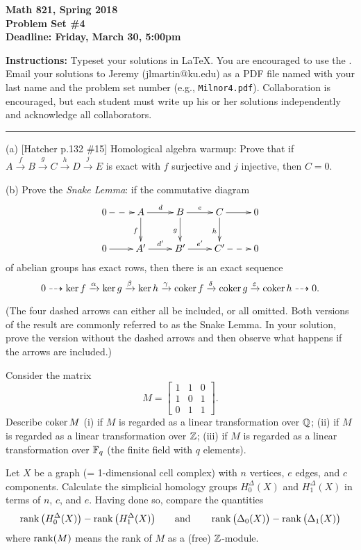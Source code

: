 

\thispagestyle{empty}
{\bf Math 821, Spring 2018\\
Problem Set \#4\\
Deadline: Friday, March 30, 5:00pm}

\textbf{Instructions:} Typeset your solutions in LaTeX.  You are encouraged to use the . Email your solutions to Jeremy (jlmartin@ku.edu) as a PDF file named with your last name and the problem set number (e.g., \texttt{Milnor4.pdf}).  Collaboration is encouraged, but each student must write up his or her solutions independently and acknowledge all collaborators.
\medskip
\hrule

\prob (a) [Hatcher p.132 \#15] Homological algebra warmup: Prove that if $A\xrightarrow{f}B\xrightarrow{g}C\xrightarrow{h}D\xrightarrow{j}E$ is exact with $f$ surjective and $j$ injective, then $C=0$.

(b) Prove the \emph{Snake Lemma}: if the commutative diagram
\[\xymatrix{
0\ar@{-->}[r] & A\rto^d\dto_f & B\rto^e\dto_g & C\rto\dto_h & 0\\
0\rto & A'\rto^{d'} & B'\rto^{e'} & C'\ar@{-->}[r] & 0
}\]
of abelian groups has exact rows, then there is an exact sequence
\[0\dashrightarrow \ker f\xrightarrow{\alpha} \ker g\xrightarrow{\beta}
  \ker h\xrightarrow{\gamma} \operatorname{coker} f\xrightarrow{\delta}
 \operatorname{coker} g\xrightarrow{\varepsilon}\operatorname{coker} h\dashrightarrow 0.\]

(The four dashed arrows can either all be included, or all omitted.  Both versions of the result are commonly referred to as the Snake Lemma.  In your solution, prove the version without the dashed arrows and then observe what happens if the arrows are included.)


\bigskip\prob Consider the matrix
$$M=\begin{bmatrix} 1&1&0\\1&0&1\\0&1&1\end{bmatrix}.$$
Describe $\operatorname{coker} M$
(i) if $M$ is regarded as a linear transformation over $\mathbb{Q}$;
(ii) if $M$ is regarded as a linear transformation over $\mathbb{Z}$;
(iii) if $M$ is regarded as a linear transformation over $\mathbb{F}_q$
(the finite field with $q$ elements).

\bigskip\prob Let $X$ be a graph (= 1-dimensional cell complex) with $n$ vertices, $e$ edges, and $c$ components.  Calculate the simplicial homology groups $H^\Delta_0(X)$ and $H^\Delta_1(X)$ in terms of $n$, $c$, and $e$.  Having done so, compare the quantities
\[\operatorname{rank}\big(H^\Delta_0(X)\big)-\operatorname{rank}\big(H^\Delta_1(X)\big) \qquad\text{and}\qquad \operatorname{rank}\big(\Delta_0(X)\big)-\operatorname{rank}\big(\Delta_1(X)\big)\]
where $\operatorname{rank}(M)$ means the rank of $M$ as a (free) $\mathbb{Z}$-module.

